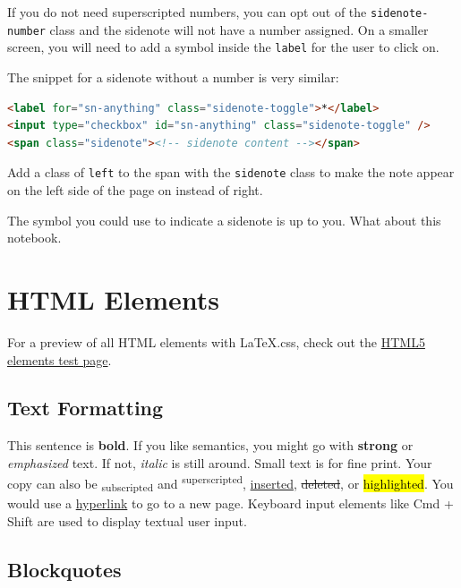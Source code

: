 \documentclass[
  11pt,
  a4paper,
]{article}
\begin{document}
If you do not need superscripted numbers, you can opt out of the
\lstinline!sidenote-number! class and the sidenote will
not have a number assigned. On a smaller screen, you will need to add a
symbol inside the \lstinline!label! for the user to click
on. 

The snippet for a sidenote without a number is very similar:

\begin{lstlisting}[language=HTML]
<label for="sn-anything" class="sidenote-toggle">*</label>
<input type="checkbox" id="sn-anything" class="sidenote-toggle" />
<span class="sidenote"><!-- sidenote content --></span>
\end{lstlisting}

Add a class of \lstinline!left! to the span with the
\lstinline!sidenote! class to make the note appear on the
left side of the page on instead of right.

The symbol you could use to indicate a sidenote is up to you. What about
this notebook. 

\section{HTML Elements}\label{html-elements}

For a preview of all HTML elements with LaTeX.css, check out the
\href{/elements}{HTML5 elements test page}.

\subsection{Text Formatting}\label{text-formatting}

This sentence is \textbf{bold}. If you like semantics, you might go with
\textbf{strong} or \emph{emphasized} text. If not, \emph{italic} is
still around. {Small} text is for fine print. Your copy can also be
\textsubscript{subscripted} and \textsuperscript{superscripted},
\ul{inserted}, \st{deleted}, or \hl{highlighted}. You would use a
\hyperref[ux21]{hyperlink} to go to a new page. Keyboard input elements
like {Cmd} + {Shift} are used to display textual user input.

\subsection{Blockquotes}\label{blockquotes}
\end{document}
